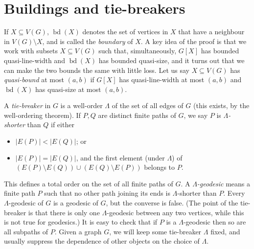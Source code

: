 \documentclass[titlepage,11pt]{article}
\newcommand{\bd}{\operatorname{bd}}
\begin{document}
	\section{Buildings and tie-breakers}
	
	If $X\subseteq V(G)$, $\bd(X)$ denotes
	the set of vertices in $X$ that have a neighbour in $V(G)\setminus X$, and is called the {\em boundary} of $X$.
	A key idea of the proof is that we work with subsets $X\subseteq V(G)$ such that, simultaneously, $G[X]$ has bounded quasi-line-width and $\bd(X)$ has bounded quasi-size, and it turns out that we can make the two bounds the same with little loss.
	Let us say $X\subseteq V(G)$ has {\em quasi-bound} at most $(a,b)$ if $G[X]$ has quasi-line-width at most $(a,b)$ and $\bd(X)$ has quasi-size at most $(a,b)$.
	
	
	A {\em tie-breaker} in $G$ is
	a well-order $\Lambda$ of the set of all edges of $G$ (this exists, by the well-ordering theorem). 
	If $P,Q$ are distinct finite paths of $G$, we say $P$ is {\em $\Lambda$-shorter} than $Q$
	if either
	\begin{itemize}
		\item $|E(P)|<|E(Q)|$; or
		\item $|E(P)|=|E(Q)|$, and the first element (under $\Lambda$) of $(E(P)\setminus E(Q))\cup (E(Q)\setminus E(P))$ belongs to $P$.
	\end{itemize}
	This defines a total order on the set of all finite paths of $G$.
	A {\em $\Lambda$-geodesic} means a finite path $P$ such that no other path joining its ends is $\Lambda$-shorter than $P$.
	Every $\Lambda$-geodesic of $G$ is a geodesic of $G$, but the converse is false.
	(The point of the tie-breaker is that there is only
	one $\Lambda$-geodesic between any two vertices, while this is not true for geodesics.)
	It is easy to check that
	if $P$ is a $\Lambda$-geodesic then so are all subpaths of $P$. Given a graph $G$, we will keep some tie-breaker $\Lambda$ fixed, 
	and usually suppress the dependence of other objects on the choice of $\Lambda$.
	
\end{document}
